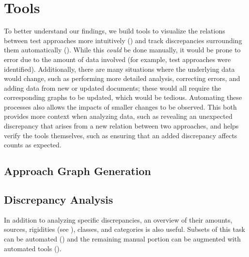 \section{Tools}
\label{tools}

To better understand our findings, we build tools to visualize the
relations between test approaches more intuitively () and track
discrepancies surrounding them automatically (). While
this \emph{could} be done manually, it would be prone to error due to the
amount of data involved (for example, \approachCount{} test approaches were
identified). Additionally, there are many situations where the underlying data
would change, such as performing more detailed analysis, correcting errors, and
adding data from new or updated documents; these would all require the
corresponding graphs to be updated, which would be tedious. Automating these
processes also allows the impacts of smaller changes to be observed. This both
provides more context when analyzing data, such as revealing an unexpected
discrepancy that arises from a new relation between two approaches, and helps
verify the tools themselves, such as ensuring that an added discrepancy affects
counts as expected.

\subsection{Approach Graph Generation}
\label{graph-gen}

\graphGenDesc{}

\subsection{Discrepancy Analysis}
\label{discrep-analysis}

In addition to analyzing specific discrepancies, an overview of their amounts,
sources, rigidities (see ), classes, and categories is
also useful. Subsets of this task can be automated ()
and the remaining manual portion can be augmented with automated
tools ().

